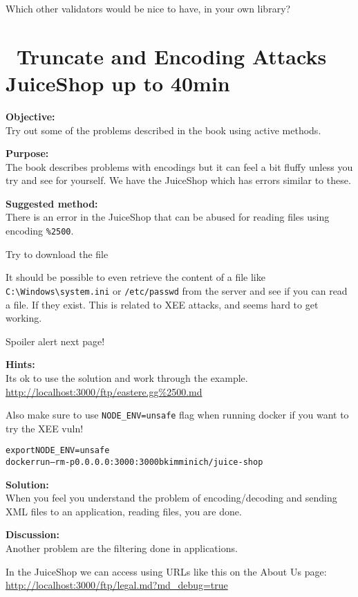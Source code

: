\documentclass[a4paper,11pt,notitlepage]{report}
\begin{document}
Which other validators would be nice to have, in your own library?


\chapter{\faExclamationTriangle\ Truncate and Encoding Attacks JuiceShop up to 40min}
\label{ex:truncate-encoding}

{\bf Objective:}\\
Try out some of the problems described in the book using active methods.

{\bf Purpose:}\\
The book describes problems with encodings but it can feel a bit fluffy unless you try and see for yourself. We have the JuiceShop which has errors similar to these.

{\bf Suggested method:}\\
There is an error in the JuiceShop that can be abused for reading files using encoding \verb+%2500+.

Try to download the file 


It should be possible to even retrieve the content of a file like \verb+C:\Windows\system.ini+ or
\verb+/etc/passwd+ from the server and see if you can read a file. If they exist. This is related to XEE attacks, and seems hard to get working.

Spoiler alert next page!
\eject



{\bf Hints:}\\
Its ok to use the solution and work through the example.
\url{http://localhost:3000/ftp/eastere.gg%2500.md}

Also make sure to use \verb+NODE_ENV=unsafe+ flag when running docker if you want to try the XEE vuln!

\begin{alltt}
export NODE_ENV=unsafe
docker run --rm -p 0.0.0.0:3000:3000 bkimminich/juice-shop
\end{alltt}

{\bf Solution:}\\
When you feel you understand the problem of encoding/decoding and sending XML files to an application, reading files, you are done.

{\bf Discussion:}\\
Another problem are the filtering done in applications.

In the JuiceShop we can access using URLs like this on the About Us page:\\
\url{http://localhost:3000/ftp/legal.md?md_debug=true}
\end{document}
